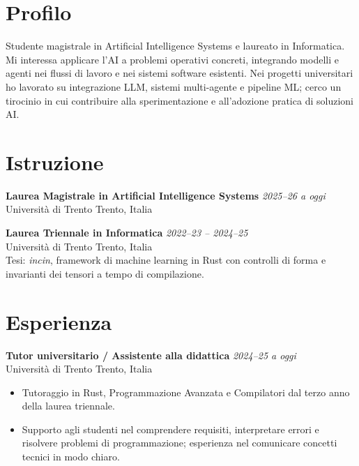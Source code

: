 \documentclass[10pt,a4paper]{article}
\begin{document}

\section{Profilo}
Studente magistrale in Artificial Intelligence Systems e laureato in Informatica. Mi interessa applicare l'AI a problemi operativi concreti, integrando modelli e agenti nei flussi di lavoro e nei sistemi software esistenti. Nei progetti universitari ho lavorato su integrazione LLM, sistemi multi-agente e pipeline ML; cerco un tirocinio in cui contribuire alla sperimentazione e all'adozione pratica di soluzioni AI.

\section{Istruzione}
\noindent\textbf{Laurea Magistrale in Artificial Intelligence Systems} \hfill \textsl{2025--26 a oggi}\\
\noindent Università di Trento \hfill Trento, Italia

\vspace{0.45ex}
\noindent\textbf{Laurea Triennale in Informatica} \hfill \textsl{2022--23 -- 2024--25}\\
\noindent Università di Trento \hfill Trento, Italia\\
\noindent Tesi: \textit{incin}, framework di machine learning in Rust con controlli di forma e invarianti dei tensori a tempo di compilazione.

\section{Esperienza}
\noindent\textbf{Tutor universitario / Assistente alla didattica} \hfill \textsl{2024--25 a oggi}\\
\noindent Università di Trento \hfill Trento, Italia
\begin{itemize}
  \item Tutoraggio in Rust, Programmazione Avanzata e Compilatori dal terzo anno della laurea triennale.
  \item Supporto agli studenti nel comprendere requisiti, interpretare errori e risolvere problemi di programmazione; esperienza nel comunicare concetti tecnici in modo chiaro.
\end{itemize}
\end{document}
